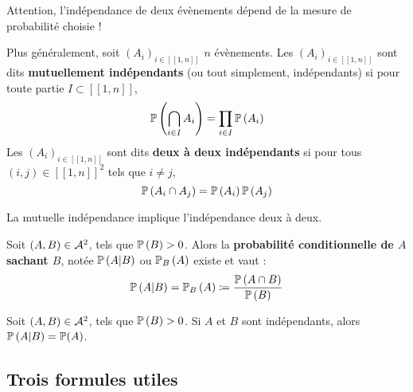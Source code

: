 \documentclass[../integ-proba.tex]{subfiles}
\begin{document}
    \begin{rem}
        Attention, l'indépendance de deux évènements dépend de la mesure de probabilité choisie !
    \end{rem}

    \begin{defi}
        Plus généralement, soit $\left( A_i \right)_{i \in [\![1,n]\!]}$ $n$ évènements.
        Les $\left( A_i \right)_{i \in [\![1,n]\!]}$ sont dits \textbf{mutuellement indépendants} (ou tout simplement, indépendants) si pour toute partie $I \subset [\![1,n]\!]$,
        \begin{displaymath}
            \mathbb{P}\left( \bigcap_{i \in I} A_i\right) = \prod_{i \in I} \mathbb{P}\left( A_i \right)
        \end{displaymath}
        Les $\left( A_i \right)_{i \in [\![1,n]\!]}$ sont dits \textbf{deux à deux indépendants} si pour tous $\left( i,j \right) \in [\![1,n]\!]^2$ tels que $i \neq j$,
        \begin{displaymath}
            \mathbb{P}\left( A_i \cap A_j \right) = \mathbb{P}\left( A_i \right) \mathbb{P} \left( A_j \right)
        \end{displaymath}
    \end{defi}

    \begin{prop}
        La mutuelle indépendance implique l'indépendance deux à deux.
    \end{prop}

    \begin{defi}
        Soit $\left( A,B \right) \in \mathcal{A}^2$, tels que $\mathbb{P}\left( B \right) > 0$.
        Alors la \textbf{probabilité conditionnelle de $A$ sachant $B$}, notée $\mathbb{P}\left( A | B \right)$ ou $\mathbb{P}_B\left( A \right)$ existe et vaut :
        \begin{displaymath}
            \mathbb{P}\left( A | B \right) = \mathbb{P}_B\left( A \right) \coloneqq \frac{\mathbb{P}\left( A \cap B \right)}{\mathbb{P}\left( B \right)}
        \end{displaymath}
    \end{defi}

    \begin{prop}
        Soit $\left( A,B \right) \in \mathcal{A}^2$, tels que $\mathbb{P}\left( B \right) > 0$.
        Si $A$ et $B$ sont indépendants, alors $\mathbb{P}\left( A | B \right) = \mathbb{P}(A)$.
    \end{prop}

    \subsection{Trois formules utiles}
\end{document}
